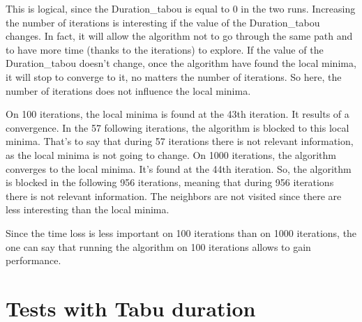 \documentclass[12pt,oneside,a4paper]{article}
\begin{document}
    This is logical, since the Duration\_tabou is equal to 0 in the two runs. 
    Increasing the number of iterations is interesting if the value of the Duration\_tabou changes. In fact, it will allow the algorithm not to go through the same path 
    and to have more time (thanks to the iterations) to explore.
    If the value of the Duration\_tabou doesn’t change, once the algorithm have found the local minima, it will stop to converge to it, no matters the number of iterations. 
    So here, the number of iterations does not influence the local minima.

    On 100 iterations, the local minima is found at the 43th iteration. It results of a convergence. In the 57 following iterations, the algorithm is blocked to this local minima. That’s to say that 
    during 57 iterations there is not relevant information, as the local minima is not going to change. 
    On 1000 iterations, the algorithm converges to the local minima. It's found at the 44th iteration. So, the algorithm is blocked in the following 956 iterations, meaning that during 
    956 iterations there is not relevant information. The neighbors are not visited since there are less interesting than the local minima.

    Since the time loss is less important on 100 iterations than on 1000 iterations, the one can say that running the algorithm on 100 iterations allows to gain performance.
    

\section{Tests with Tabu duration}
\end{document}
